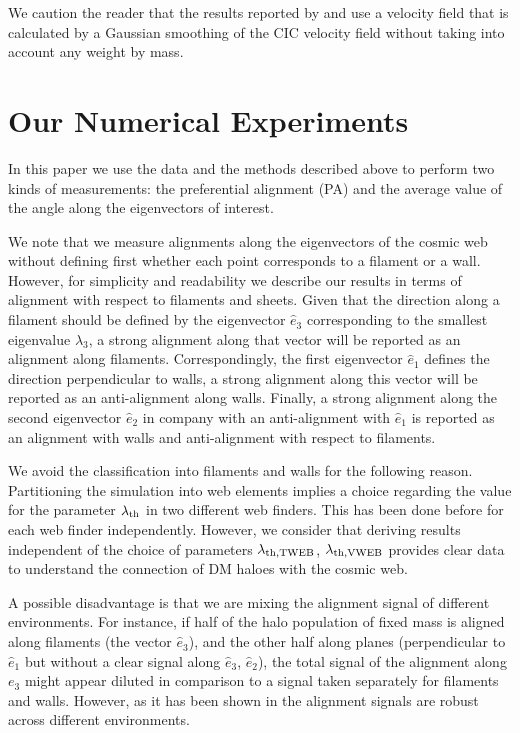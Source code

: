 \documentclass[useAMS,usenatbib]{mn2e}
\begin{document}
We caution the reader that the results reported by
\cite{Vweb} and \cite{Libeskind2013} use a velocity field that is
calculated by a Gaussian smoothing of the CIC velocity field without
taking into account any weight by mass.   


\section{Our Numerical Experiments}
\label{sec:experiments}

In this paper we use the data and the methods described above to
perform two kinds of measurements: the preferential alignment (PA) and the
average value of the angle along the eigenvectors of interest.

We note that we measure alignments along the eigenvectors of the
cosmic web without defining first whether each point corresponds to a
filament or a wall. However, for simplicity and readability we describe
our results in terms of alignment with respect to filaments and
sheets. Given that the direction along a filament should be defined by the
eigenvector $\hat{e}_3$ corresponding to the smallest eigenvalue $\lambda_3$, a
strong alignment along that vector will be reported as an alignment
along filaments. Correspondingly, the first eigenvector $\hat{e}_{1}$
defines the direction perpendicular to walls, a strong alignment along
this vector will be reported as an anti-alignment along
walls. Finally, a strong alignment along the second eigenvector
$\hat{e}_2$ in company with an anti-alignment with $\hat{e}_1$ is
reported as an alignment with walls and anti-alignment with respect to
filaments. 


We avoid the classification into filaments and walls for the following
reason. Partitioning the simulation into web elements implies
a choice regarding the value for the parameter $\lambda_{\rm th}$ in
two different web finders. This has been done before for each web
finder independently. However, we consider that deriving results
independent of the choice of parameters $\lambda_{\rm th,TWEB}$,
$\lambda_{\rm th, VWEB}$ provides clear data to understand the
connection of DM haloes with the cosmic web.  

A possible disadvantage is that we are mixing the alignment signal
of different environments. For instance, if half of the halo population of
fixed mass is aligned along filaments (the vector $\hat{e}_3$), and the
other half along planes (perpendicular to $\hat{e}_1$ but without a
clear signal along $\hat{e}_3$, $\hat{e}_2$), the total signal of the
alignment along $e_3$ might appear diluted in comparison to a signal
taken separately for filaments and walls. However, as it has been
shown in \cite{Libeskind2013} the alignment signals are robust across
different environments. 
\end{document}
